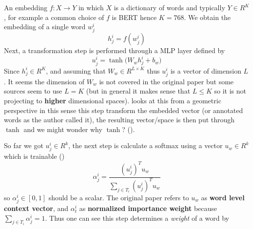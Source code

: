 An embedding $f: X \rightarrow Y $ in which $X$ is a dictionary of words and typically $Y \in R^K$, for example a common choice of $f$ is BERT \cite{BERT} hence $K = 768$. We obtain the embedding of a single word $w^i_j$
\begin{equation}\label{eq:HAN_word_attention_embed}
    h^i_j = f(w^i_j)
\end{equation}
Next, a transformation step is performed through a MLP layer defined by
\begin{equation}\label{eq:HAN_word_attention_MLP}
    u^i_j = \tanh{\Big( W_w h^i_j + b_w \Big)}
\end{equation}
Since $h^i_j \in R^K$, and assuming that $W_w \in R^{ L \times K}$ thus $u^i_j$ is a vector of dimension $L$. It seems the dimension of $W_w$ is not covered in the original paper but some sources seem to use $L = K$ (but in general it makes sense that $L \leq K$ so it is not projecting to \textbf{higher} dimensional spaces). \cite{HAN_math_notes} looks at this from a geometric perspective in this sense this step transform the embedded vector (or annotated words as the author called it), the resulting vector/space is then put through $\tanh$ and we might wonder why $\tanh$? ().

So far we got $u^i_j \in R^k$, the next step is calculate a softmax using a vector $u_w \in R^k$ which is trainable ()
\begin{equation}
    \alpha^i_j = \frac{(u^i_j)^T u_w}{\sum_{j \in T_i} (u^i_j)^T u_w}
\end{equation}
so $\alpha^i_j \in [0, 1]$ should be a scalar. The original paper refers to $u_w$ as \textbf{word level context vector}, and $\alpha^i_t$ as \textbf{normalized importance weight} because $\sum_{j \in T_i} \alpha^i_j = 1$. Thus one can see this step determines a \textit{weight} of a word by